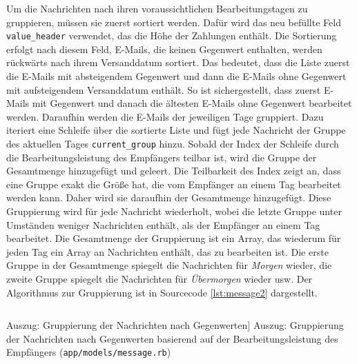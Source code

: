 \noindent Um die Nachrichten nach ihren voraussichtlichen Bearbeitungstagen zu gruppieren, müssen sie zuerst sortiert werden. Dafür wird das neu befüllte Feld \texttt{value\_header} verwendet, das die Höhe der Zahlungen enthält. Die Sortierung erfolgt nach diesem Feld, E-Mails, die keinen Gegenwert enthalten, werden rückwärts nach ihrem Versanddatum sortiert. Das bedeutet, dass die Liste zuerst die E-Mails mit absteigendem Gegenwert und dann die E-Mails ohne Gegenwert mit aufsteigendem Versanddatum enthält. So ist sichergestellt, dass zuerst E-Mails mit Gegenwert und danach die ältesten E-Mails ohne Gegenwert bearbeitet werden. Daraufhin werden die E-Mails der jeweiligen Tage gruppiert. Dazu iteriert eine Schleife über die sortierte Liste und fügt jede Nachricht der Gruppe des aktuellen Tages \texttt{current\_group} hinzu. Sobald der Index der Schleife durch die Bearbeitungsleistung des Empfängers teilbar ist, wird die Gruppe der Gesamtmenge hinzugefügt und geleert. Die Teilbarkeit des Index zeigt an, dass eine Gruppe exakt die Größe hat, die vom Empfänger an einem Tag bearbeitet werden kann. Daher wird sie daraufhin der Gesamtmenge hinzugefügt. Diese Gruppierung wird für jede Nachricht wiederholt, wobei die letzte Gruppe unter Umständen weniger Nachrichten enthält, als der Empfänger an einem Tag bearbeitet. Die Gesamtmenge der Gruppierung ist ein Array, das wiederum für jeden Tag ein Array an Nachrichten enthält, das zu bearbeiten ist. Die erste Gruppe in der Gesamtmenge spiegelt die Nachrichten für \textit{Morgen} wieder, die zweite Gruppe spiegelt die Nachrichten für \textit{Übermorgen} wieder usw. Der Algorithmus zur Gruppierung ist in Sourcecode \ref{lst:message2} dargestellt.

\begin{listing}[!ht]
\inputminted[firstline=22, lastline=38,linenos]{ruby}{Listings/Pkg2/message.rb}

\caption
    [Auszug: Gruppierung der Nachrichten nach Gegenwerten]
    {Auszug: Gruppierung der Nachrichten nach Gegenwerten basierend auf der Bearbeitungsleistung des Empfängers (\texttt{app/models/message.rb})}

\label{lst:message2}
\end{listing}

